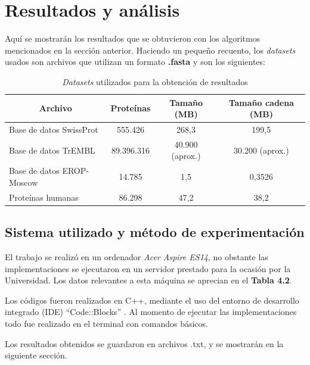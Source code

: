 \chapter{Resultados y análisis}

Aquí se mostrarán los resultados que se obtuvieron con los algoritmos mencionados en la sección anterior. Haciendo un pequeño recuento, los \textit{datasets} usados son archivos que utilizan un formato \textbf{.fasta} y son los siguientes:

\begin{table}[h]
\centering
\begin{tabular}{|l|c|c|c|}
\hline
\multicolumn{1}{|c|}{\textbf{Archivo}} & \textbf{Proteínas} & \textbf{Tamaño (MB)} & \textbf{Tamaño cadena (MB)} \\ \hline
Base de datos SwissProt    & 555.426                & 268,3                & 199,5              \\
Base de datos TrEMBL        & 89.396.316              & 40.900 (aprox.)       & 30.200 (aprox.)     \\
Base de datos EROP-Moscow        & 14.785                 & 1,5                  & 0,3526                \\
Proteínas humanas     & 86.298                 & 47,2                 & 38,2               \\ \hline
\end{tabular}
\caption{\textit{Datasets} utilizados para la obtención de resultados}
\label{tb:labelr1}
\end{table} 

\section{Sistema utilizado y método de experimentación}

El trabajo se realizó en un ordenador \textit{Acer Aspire ES14}, no obstante las implementaciones se ejecutaron en un servidor prestado para la ocasión por la Universidad. Los datos relevantes a esta máquina se aprecian en el \textbf{Tabla 4.2}.

Los códigos fueron realizados en C++, mediante el uso del entorno de desarrollo integrado (IDE) ``Code::Blocks'' \cite{codeblocks}. Al momento de ejecutar las implementaciones todo fue realizado en el terminal con comandos básicos.

Los resultados obtenidos se guardaron en archivos .txt, y se mostrarán en la siguiente sección.

\newpage

